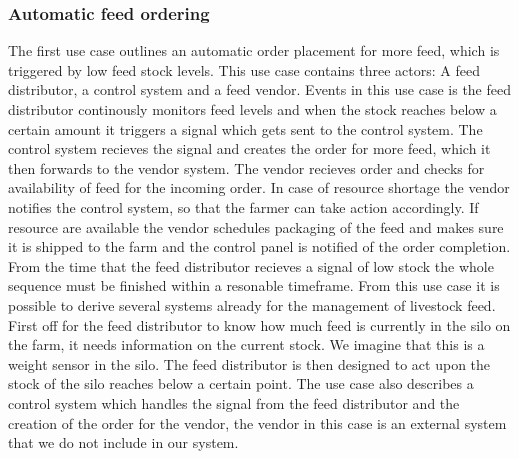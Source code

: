 \documentclass[conference]{IEEEtran}
\begin{document}
\subsubsection{Automatic feed ordering}
The first use case outlines an automatic order placement for more feed, which is triggered by low feed stock levels. This use case contains three actors: A feed distributor, a control system and a feed vendor.
Events in this use case is the feed distributor continously monitors feed levels and when the stock reaches below a certain amount it triggers a signal which gets sent to the control system.
The control system recieves the signal and creates the order for more feed, which it then forwards to the vendor system.
The vendor recieves order and checks for availability of feed for the incoming order. In case of resource shortage the vendor notifies the control system, so that the farmer can take action accordingly.
If resource are available the vendor schedules packaging of the feed and makes sure it is shipped to the farm and the control panel is notified of the order completion. From the time that the feed distributor recieves a signal of low stock the whole sequence must be finished within a resonable timeframe. \newline
From this use case it is possible to derive several systems already for the management of livestock feed. First off for the feed distributor to know how much feed is currently in the silo on the farm, it needs information on the current stock. We imagine that this is a weight sensor in the silo. The feed distributor is then designed to act upon the stock of the silo reaches below a certain point. \newline
The use case also describes a control system which handles the signal from the feed distributor and the creation of the order for the vendor, the vendor in this case is an external system that we do not include in our system.
\end{document}

